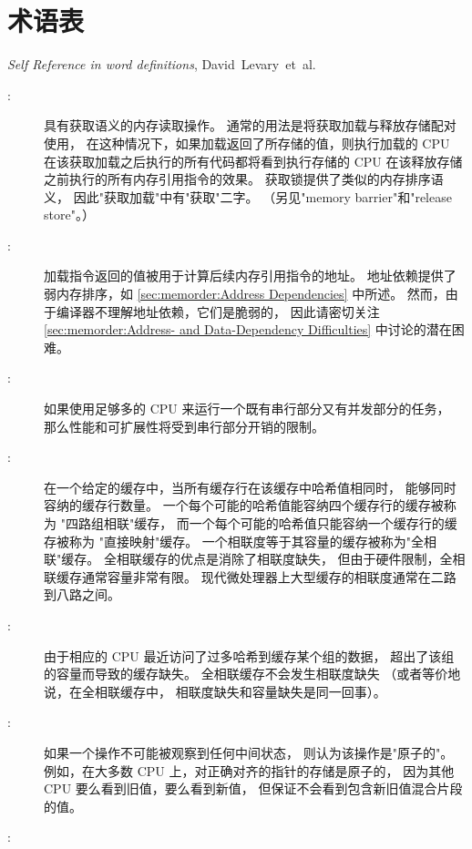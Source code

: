
\chapter{术语表}
%
	 {\emph{Self Reference in word definitions},
	        David~Levary~et~al.}

\begin{description}
\item[:]
	具有获取语义的内存读取操作。
	通常的用法是将获取加载与释放存储配对使用，
	在这种情况下，如果加载返回了所存储的值，则执行加载的
	CPU 在该获取加载之后执行的所有代码都将看到执行存储的
	CPU 在该释放存储之前执行的所有内存引用指令的效果。
	获取锁提供了类似的内存排序语义，
	因此"获取加载"中有"获取"二字。
	（另见"memory barrier"和"release store"。）
\item[:]
	加载指令返回的值被用于计算后续内存引用指令的地址。
	地址依赖提供了弱内存排序，如
	\cref{sec:memorder:Address Dependencies}
	中所述。
	然而，由于编译器不理解地址依赖，它们是脆弱的，
	因此请密切关注
	\cref{sec:memorder:Address- and Data-Dependency Difficulties}
	中讨论的潜在困难。
\item[:]
	如果使用足够多的 CPU 来运行一个既有串行部分又有并发部分的任务，
	那么性能和可扩展性将受到串行部分开销的限制。
\item[:]
	在一个给定的缓存中，当所有缓存行在该缓存中哈希值相同时，
	能够同时容纳的缓存行数量。
	一个每个可能的哈希值能容纳四个缓存行的缓存被称为
	"四路组相联"缓存，
	而一个每个可能的哈希值只能容纳一个缓存行的缓存被称为
	"直接映射"缓存。
	一个相联度等于其容量的缓存被称为"全相联"缓存。
	全相联缓存的优点是消除了相联度缺失，
	但由于硬件限制，全相联缓存通常容量非常有限。
	现代微处理器上大型缓存的相联度通常在二路到八路之间。
\item[:]
	由于相应的 CPU 最近访问了过多哈希到缓存某个组的数据，
	超出了该组的容量而导致的缓存缺失。
	全相联缓存不会发生相联度缺失
	（或者等价地说，在全相联缓存中，
	相联度缺失和容量缺失是同一回事）。
\item[:]
	如果一个操作不可能被观察到任何中间状态，
	则认为该操作是"原子的"。
	例如，在大多数 CPU 上，对正确对齐的指针的存储是原子的，
	因为其他 CPU 要么看到旧值，要么看到新值，
	但保证不会看到包含新旧值混合片段的值。
\item[:]

\end{description}
